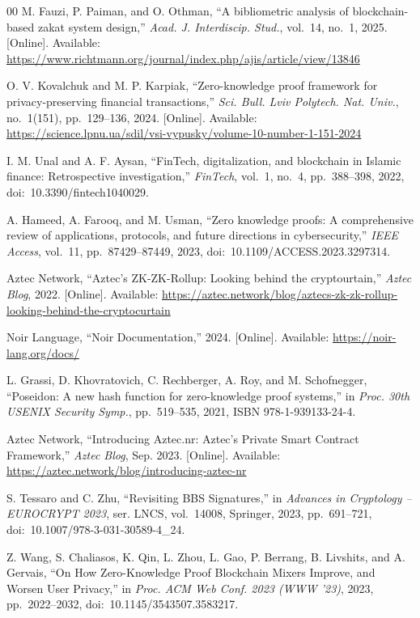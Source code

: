 \documentclass[conference]{IEEEtran}
\begin{document}
\begin{thebibliography}{00}
M. Fauzi, P. Paiman, and O. Othman, ``A bibliometric analysis of blockchain-based zakat system design,'' \textit{Acad. J. Interdiscip. Stud.}, vol.~14, no.~1, 2025. [Online]. Available: \url{https://www.richtmann.org/journal/index.php/ajis/article/view/13846}

O. V. Kovalchuk and M. P. Karpiak, ``Zero-knowledge proof framework for privacy-preserving financial transactions,'' \textit{Sci. Bull. Lviv Polytech. Nat. Univ.}, no.~1(151), pp.~129--136, 2024. [Online]. Available: \url{https://science.lpnu.ua/sdil/vsi-vypusky/volume-10-number-1-151-2024}

I. M. Unal and A. F. Aysan, ``FinTech, digitalization, and blockchain in Islamic finance: Retrospective investigation,'' \textit{FinTech}, vol.~1, no.~4, pp.~388--398, 2022, doi:~10.3390/fintech1040029.

A. Hameed, A. Farooq, and M. Usman, ``Zero knowledge proofs: A comprehensive review of applications, protocols, and future directions in cybersecurity,'' \textit{IEEE Access}, vol.~11, pp.~87429--87449, 2023, doi:~10.1109/ACCESS.2023.3297314.

Aztec Network, ``Aztec's ZK-ZK-Rollup: Looking behind the cryptourtain,'' \textit{Aztec Blog}, 2022. [Online]. Available: \url{https://aztec.network/blog/aztecs-zk-zk-rollup-looking-behind-the-cryptocurtain}

Noir Language, ``Noir Documentation,'' 2024. [Online]. Available: \url{https://noir-lang.org/docs/}

L. Grassi, D. Khovratovich, C. Rechberger, A. Roy, and M. Schofnegger, ``Poseidon: A new hash function for zero-knowledge proof systems,'' in \textit{Proc. 30th USENIX Security Symp.}, pp.~519--535, 2021, ISBN 978-1-939133-24-4.

Aztec Network, ``Introducing Aztec.nr: Aztec's Private Smart Contract Framework,'' \textit{Aztec Blog}, Sep. 2023. [Online]. Available: \url{https://aztec.network/blog/introducing-aztec-nr}

S. Tessaro and C. Zhu, ``Revisiting BBS Signatures,'' in \textit{Advances in Cryptology -- EUROCRYPT 2023}, ser. LNCS, vol.~14008, Springer, 2023, pp.~691--721, doi:~10.1007/978-3-031-30589-4\_24.

Z. Wang, S. Chaliasos, K. Qin, L. Zhou, L. Gao, P. Berrang, B. Livshits, and A. Gervais, ``On How Zero-Knowledge Proof Blockchain Mixers Improve, and Worsen User Privacy,'' in \textit{Proc. ACM Web Conf. 2023 (WWW '23)}, 2023, pp.~2022--2032, doi:~10.1145/3543507.3583217.


\end{thebibliography}
\end{document}
